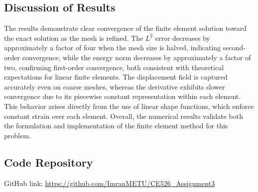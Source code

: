 \subsection*{Discussion of Results}

The results demonstrate clear convergence of the finite element solution toward the exact solution as the mesh is refined. The $L^2$ error decreases by approximately a factor of four when the mesh size is halved, indicating second-order convergence, while the energy norm decreases by approximately a factor of two, confirming first-order convergence, both consistent with theoretical expectations for linear finite elements. The displacement field is captured accurately even on coarse meshes, whereas the derivative exhibits slower convergence due to its piecewise constant representation within each element. This behavior arises directly from the use of linear shape functions, which enforce constant strain over each element. Overall, the numerical results validate both the formulation and implementation of the finite element method for this problem.

\subsection*{Code Repository}

GitHub link: \url{https://github.com/ImranMETU/CE526_Assignment3}